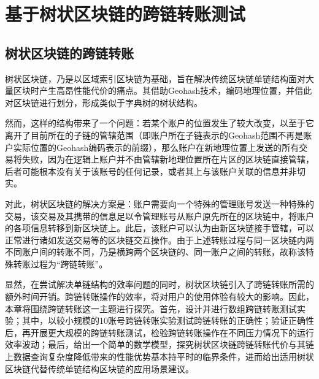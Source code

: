 %
%
%
%
%

\chapter{基于树状区块链的跨链转账测试}

\section{树状区块链的跨链转账}

树状区块链，乃是以区域索引区块链为基础，旨在解决传统区块链单链结构面对大量区块时产生高昂性能代价的痛点。其借助Geohash技术，编码地理位置，并借此对区块链进行划分，形成类似于字典树的树状结构。

然而，这样的结构带来了一个问题：若某个账户的位置发生了较大改变，以至于它离开了目前所在的子链的管辖范围（即账户所在子链表示的Geohash范围不再是账户实际位置的Geohash编码表示的前缀），那么账户在新地理位置上发送的所有交易将失败，因为在逻辑上账户并不由管辖新地理位置所在片区的区块链直接管辖，后者可能根本没有关于该账号的任何记录，或者其上与该账户关联的信息并非切实。

对此，树状区块链的解决方案是：账户需要向一个特殊的管理账号发送一种特殊的交易，该交易及其携带的信息足以令管理账号从账户原先所在的区块链中，将账户的各项信息转移到新区块链上。此后，该账户可以认为由新区块链接手管辖，可以正常进行诸如发送交易等的区块链交互操作。由于上述转账过程与同一区块链内两不同账户间的转账不同，乃是横跨两个区块链的、同一账户之间的转账，故称该特殊转账过程为“跨链转账”。

显然，在尝试解决单链结构的效率问题的同时，树状区块链引入了跨链转账所需的额外时间开销。跨链转账操作的效率，将对用户的使用体验有较大的影响。因此，本章将围绕跨链转账这一主题进行探究。首先，设计并进行数组跨链转账测试实验；其中，以较小规模的10账号跨链转账实验测试跨链转账的正确性；验证正确性后，再开展更大规模的跨链转账测试，检验跨链转账操作在不同压力情况下的运行效率波动；最后，给出一个简单的数学模型，探究树状区块链跨链转账代价与其链上数据查询复杂度降低带来的性能优势基本持平时的临界条件，进而给出适用树状区块链代替传统单链结构区块链的应用场景建议。

